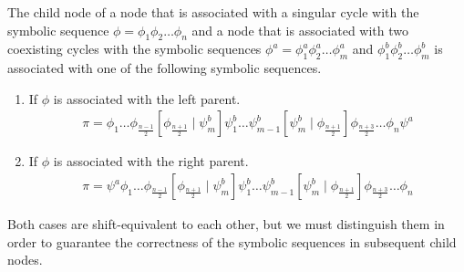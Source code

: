\begin{theorem}
	\label{theorem:child.symbolic.2}
	The child node of a node that is associated with a singular cycle with the symbolic sequence $\phi = \phi_1\phi_2 \dots \phi_n$ and a node that is associated with two coexisting cycles with the symbolic sequences $\phi^a = \phi^a_1\phi^a_2 \dots \phi^a_m$ and $\phi^b_1\phi^b_2 \dots \phi^b_m$ is associated with one of the following symbolic sequences.
	\begin{enumerate}
		\item If $\phi$ is associated with the left parent.
		      \begin{align}
			      \pi =
			      \phi_1 \dots \phi_{\frac{n-1}{2}} \left[\phi_{\frac{n+1}{2}} \mid \psi^b_m\right]
			      \psi^b_1 \dots \psi^b_{m-1} \left[\psi^b_m \mid \phi_{\frac{n+1}{2}}\right]
			      \phi_{\frac{n+3}{2}} \dots \phi_n \psi^a
		      \end{align}
		\item If $\phi$ is associated with the right parent.
		      \begin{align}
			      \pi =
			      \psi^a \phi_1 \dots \phi_{\frac{n-1}{2}} \left[\phi_{\frac{n+1}{2}} \mid \psi^b_m\right]
			      \psi^b_1 \dots \psi^b_{m-1} \left[\psi^b_m \mid \phi_{\frac{n+1}{2}}\right]
			      \phi_{\frac{n+3}{2}} \dots \phi_n
		      \end{align}
	\end{enumerate}
	Both cases are shift-equivalent to each other, but we must distinguish them in order to guarantee the correctness of the symbolic sequences in subsequent child nodes.
\end{theorem}

